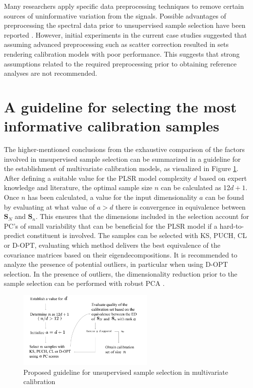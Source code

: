 \documentclass[journal=ancham,manuscript=article]{achemso}
\begin{document}
Many researchers apply specific data preprocessing techniques to remove certain sources of uninformative variation from the signals. Possible advantages of preprocessing the spectral data prior to unsupervised sample selection have been reported \cite{Liu2019}.
However, initial experiments in the current case studies suggested that assuming advanced preprocessing such as scatter correction resulted in sets rendering calibration models with poor performance. This suggests that strong assumptions related to the required preprocessing prior to obtaining reference analyses are not recommended.


\section*{A guideline for selecting the most informative calibration samples}\label{scheme}

The higher-mentioned conclusions from the exhaustive comparison of the factors involved in unsupervised sample selection can be summarized in a guideline for the establishment of multivariate calibration models, as visualized in Figure \ref{fig_scheme}. After defining a suitable value for the PLSR model complexity $d$ based on expert knowledge and literature, the optimal sample size $n$ can be calculated as 12$d+1$. Once $n$ has been calculated, a value for the input dimensionality $a$ can be found by evaluating at what value of $a>d$ there is convergence in equivalence between $\mathbf{S}_N$ and $\mathbf{S}_n$. This ensures that the dimensions included in the selection account for PC's of small variability that can be beneficial for the PLSR model if a hard-to-predict constituent is involved. The samples can be selected with KS, PUCH, CL or D-OPT, evaluating which method delivers the best equivalence of the covariance matrices based on their eigendecompositions. It is recommended to analyze the presence of potential outliers, in particular when using D-OPT selection. In the presence of outliers, the dimensionality reduction prior to the sample selection can be performed with robust PCA \cite{Hubert2005}.


\begin{figure}[b]
\includegraphics[width=0.6\textwidth]{manuscript/figures/scheme.png}
\centering
\caption{Proposed guideline for unsupervised sample selection in multivariate calibration}
\label{fig_scheme}
\end{figure}
\end{document}
